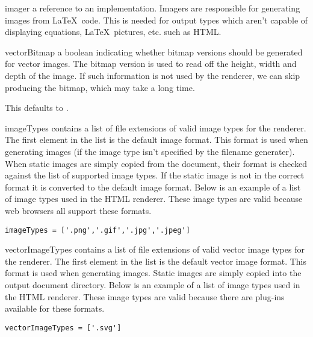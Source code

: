 \begin{memberdesc}[Renderer]{imager}
a reference to an  implementation.  Imagers are responsible
for generating images from \LaTeX\ code.  This is needed for output types 
which aren't capable of displaying equations, \LaTeX\ pictures, etc. such
as HTML.
\end{memberdesc}

\begin{memberdesc}[Renderer]{vectorBitmap}
a boolean indicating whether bitmap versions should be generated for vector
images. The bitmap version is used to read off the height, width and depth of
the image. If such information is not used by the renderer, we can skip
producing the bitmap, which may take a long time.

This defaults to .
\end{memberdesc}

\begin{memberdesc}[Renderer]{imageTypes}
contains a list of file extensions of valid image types for the renderer.
The first element in the list is the default image format.  This format
is used when generating images (if the image type isn't specified by
the filename generater).  When static images are simply copied from
the document, their format is checked against the list of supported image
types.  If the static image is not in the correct format it is converted
to the default image format.  Below is an example of a list of image
types used in the HTML renderer.  These image types are valid because 
web browsers all support these formats.
\begin{verbatim}
imageTypes = ['.png','.gif','.jpg','.jpeg']
\end{verbatim}
\end{memberdesc}

\begin{memberdesc}[Renderer]{vectorImageTypes}
contains a list of file extensions of valid vector image types for the
renderer.  The first element in the list is the default vector image 
format.  This format is used when generating images.  Static images
are simply copied into the output document directory.  Below is an
example of a list of image types used in the HTML renderer.  These
image types are valid because there are plug-ins available for these
formats.
\begin{verbatim}
vectorImageTypes = ['.svg']
\end{verbatim}
\end{memberdesc}

